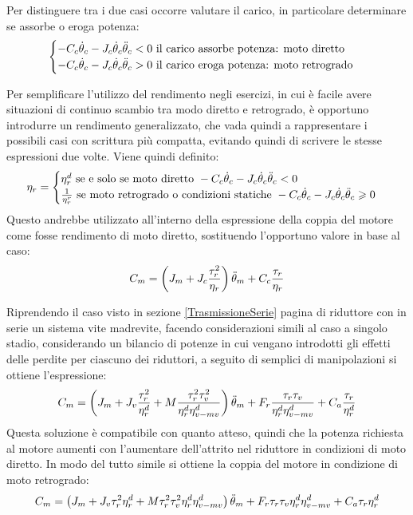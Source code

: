 Per distinguere tra i due casi occorre valutare il carico, in particolare determinare se assorbe o eroga potenza:
\[
\begin{cases}
    -C_c\dot{\theta}_c - J_c \dot{\theta}_c \Ddot{\theta}_c < 0 \text{ il carico assorbe potenza: moto diretto} \\
    -C_c\dot{\theta}_c - J_c \dot{\theta}_c \Ddot{\theta}_c > 0 \text{ il carico eroga potenza: moto retrogrado}
\end{cases}
\]

Per semplificare l'utilizzo del rendimento negli esercizi, in cui è facile avere situazioni di continuo scambio tra modo diretto e retrogrado, è opportuno introdurre un rendimento generalizzato, che vada quindi a rappresentare i possibili casi con scrittura più compatta, evitando quindi di scrivere le stesse espressioni due volte.
Viene quindi definito:
\[
\eta_r = 
\begin{cases}
    \eta_r^d \text{ se e solo se moto diretto } -C_c\dot{\theta}_c - J_c \dot{\theta}_c\Ddot{\theta}_c < 0 \\
    \frac{1}{\eta_r^r} \text{ se moto retrogrado o condizioni statiche } -C_c\dot{\theta}_c - J_c \dot{\theta}_c\Ddot{\theta}_c \geqslant 0
\end{cases}
\]
Questo andrebbe utilizzato all'interno della espressione della coppia del motore come fosse rendimento di moto diretto, sostituendo l'opportuno valore in base al caso:
\[
C_m = \left(J_m+J_c\frac{\tau^2_r}{\eta_r}\right) \Ddot{\theta}_m + C_c\frac{\tau_r}{\eta_r}
\]

Riprendendo il caso visto in sezione \ref{TrasmissioneSerie} pagina \pageref{TrasmissioneSerie} di riduttore con in serie un sistema vite madrevite, facendo considerazioni simili al caso a singolo stadio, considerando un bilancio di potenze in cui vengano introdotti gli effetti delle perdite per ciascuno dei riduttori, a seguito di semplici di manipolazioni si ottiene l'espressione:
\[
C_m=\left(J_m+J_v \frac{\tau^2_r}{\eta_r^d} + M \frac{\tau_r^2 \tau_v^2}{\eta_r^d \eta^d_{v-mv}}\right)\Ddot{\theta}_m + F_r \frac{\tau_r \tau_v}{\eta_r^d \eta^d_{v-mv}} + C_a \frac{\tau_r}{\eta_r^d}
\]
Questa soluzione è compatibile con quanto atteso, quindi che la potenza richiesta al motore aumenti con l'aumentare dell'attrito nel riduttore in condizioni di moto diretto.
In modo del tutto simile si ottiene la coppia del motore in condizione di moto retrogrado:
\[
C_m=\left(J_m+J_v \tau^2_r\eta_r^d + M \tau_r^2 \tau_v^2\eta_r^d \eta^d_{v-mv}\right)\Ddot{\theta}_m + F_r \tau_r \tau_v\eta_r^d \eta^d_{v-mv} + C_a \tau_r\eta_r^d
\]


